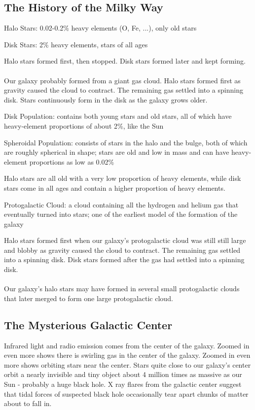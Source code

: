 \documentclass[12pt]{article}
\begin{document}
\subsection{The History of the Milky Way}
\begin{definition} Halo Stars: 0.02-0.2\% heavy elements (O, Fe, ...), only old stars \end{definition} 
\begin{definition} Disk Stars: 2\% heavy elements, stars of all ages \end{definition}
Halo stars formed first, then stopped. Disk stars formed later and kept forming. \\~\\
Our galaxy probably formed from a giant gas cloud. Halo stars formed first as gravity caused the cloud to contract. The remaining gas settled into a spinning disk. Stars continuously form in the disk as the galaxy grows older. 
\begin{definition} Disk Population: contains both young stars and old stars, all of which have heavy-element proportions of about 2\%, like the Sun \end{definition}
\begin{definition} Spheroidal Population: consists of stars in the halo and the bulge, both of which are roughly spherical in shape; stars are old and low in mass and can have heavy-element proportions as low as 0.02\% \end{definition}
Halo stars are all old with a very low proportion of heavy elements, while disk stars come in all ages and contain a higher proportion of heavy elements. 
\begin{definition} Protogalactic Cloud: a cloud containing all the hydrogen and helium gas that eventually turned into stars; one of the earliest model of the formation of the galaxy \end{definition}
Halo stars formed first when our galaxy's protogalactic cloud was still still large and blobby as gravity caused the cloud to contract. The remaining gas settled into a spinning disk. Disk stars formed after the gas had settled into a spinning disk. \\~\\
Our galaxy's halo stars may have formed in several small protogalactic clouds that later merged to form one large protogalactic cloud. 

\subsection{The Mysterious Galactic Center}
Infrared light and radio emission comes from the center of the galaxy. Zoomed in even more shows there is swirling gas in the center of the galaxy. Zoomed in even more shows orbiting stars near the center. 
Stars quite close to our galaxy's center orbit a nearly invisible and tiny object about 4 million times as massive as our Sun - probably a huge black hole. X ray flares from the galactic center suggest that tidal forces of suspected black hole occasionally tear apart chunks of matter about to fall in. 
\end{document}
